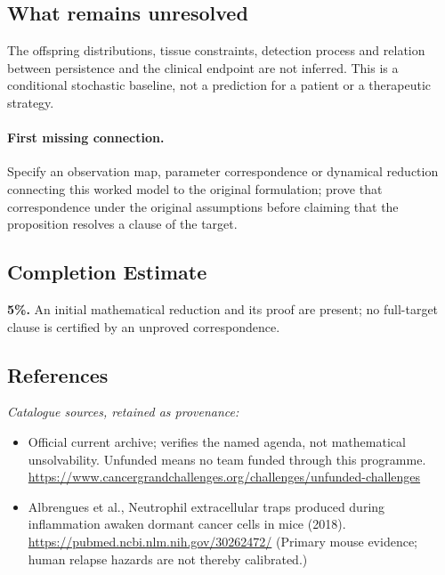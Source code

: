 \documentclass[11pt]{article}
\begin{document}
\subsection{What remains unresolved}
The offspring distributions, tissue constraints, detection process and relation between persistence and the clinical endpoint are not inferred. This is a conditional stochastic baseline, not a prediction for a patient or a therapeutic strategy.
\paragraph{First missing connection.} Specify an observation map, parameter correspondence or dynamical reduction connecting this worked model to the original formulation; prove that correspondence under the original assumptions before claiming that the proposition resolves a clause of the target.
\subsection{Completion Estimate}
\textbf{5\%.} An initial mathematical reduction and its proof are present; no full-target clause is certified by an unproved correspondence.
\subsection{References}
\noindent\emph{Catalogue sources, retained as provenance:}
\begin{itemize}
\item Official current archive; verifies the named agenda, not mathematical unsolvability. Unfunded means no team funded through this programme. \url{https://www.cancergrandchallenges.org/challenges/unfunded-challenges}
\item Albrengues et al., Neutrophil extracellular traps produced during inflammation awaken dormant cancer cells in mice (2018). \url{https://pubmed.ncbi.nlm.nih.gov/30262472/} (Primary mouse evidence; human relapse hazards are not thereby calibrated.)
\end{itemize}
\clearpage


\appendix
\end{document}
